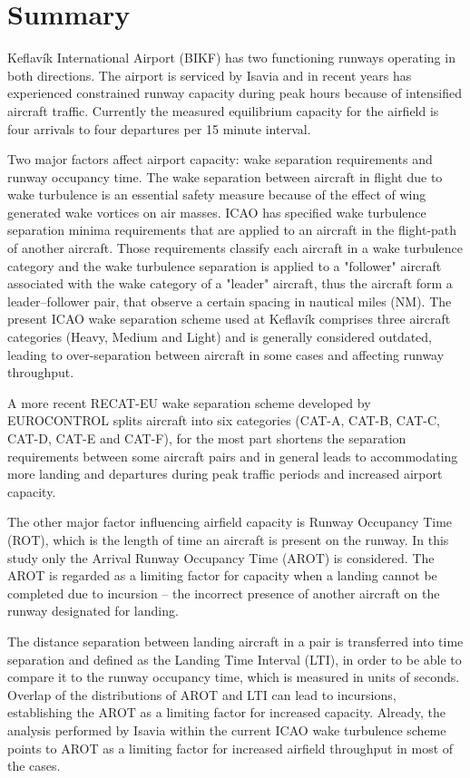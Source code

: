 


\chapter{Summary}\label{cha:summary}

Keflavík International Airport (BIKF) has two functioning runways operating in both directions. The airport is serviced by Isavia and in recent years has experienced constrained runway capacity during peak hours because of intensified aircraft traffic. Currently the measured equilibrium capacity for the airfield is four arrivals to four departures per 15 minute interval. 

Two major factors affect airport capacity: wake separation requirements and runway occupancy time. The wake  separation between aircraft in flight due to wake turbulence is an essential safety measure because of the effect of wing generated wake vortices on air masses. ICAO has specified wake turbulence separation minima requirements that are applied to an aircraft in the flight-path of another aircraft. Those requirements classify each aircraft in a wake turbulence category and the wake turbulence separation is applied to a "follower" aircraft associated with the wake category of a "leader" aircraft, thus the aircraft form a leader--follower pair, that observe a certain spacing in nautical miles (NM). The present ICAO wake separation scheme used at Keflavík comprises three aircraft categories (Heavy, Medium and Light) and is generally considered outdated, leading to over-separation between aircraft in some cases and affecting runway throughput. 

A more recent RECAT-EU wake separation scheme developed by EUROCONTROL splits aircraft into six categories (CAT-A, CAT-B, CAT-C, CAT-D, CAT-E and CAT-F), for the most part shortens the separation requirements between some aircraft pairs and in general leads to accommodating more landing and departures during peak traffic periods and increased airport capacity. 

The other major factor influencing airfield capacity is Runway Occupancy Time (ROT), which is the length of time an aircraft is present on the runway. In this study only the Arrival Runway Occupancy Time (AROT) is considered. The AROT is regarded as a limiting factor for capacity when a landing cannot be completed due to incursion -- the incorrect presence of another aircraft on the runway designated for landing. 

The distance separation between landing aircraft in a pair is transferred into time separation and defined as the Landing Time Interval (LTI), in order to be able to compare it to the runway occupancy time, which is measured in units of seconds. Overlap of the distributions of AROT and LTI can lead to incursions, establishing the AROT as a limiting factor for increased capacity.
Already, the analysis performed by Isavia within the current ICAO wake turbulence scheme points to AROT as a limiting factor for increased airfield throughput in most of the cases. 

